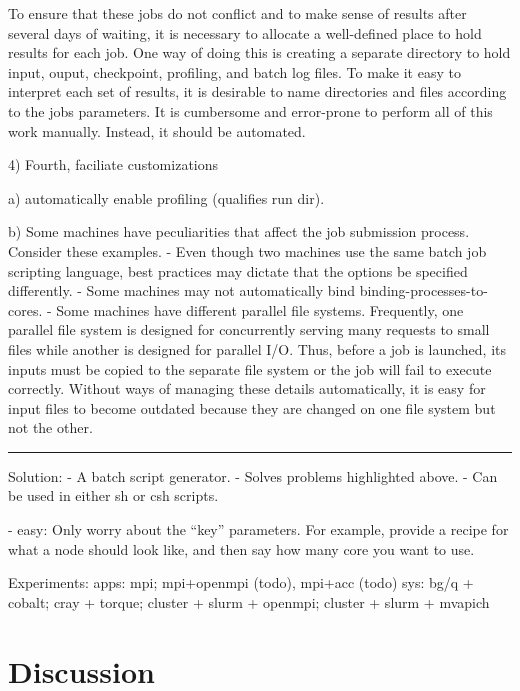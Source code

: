 To ensure that these jobs do not conflict and to make sense of results after several days of waiting, it is necessary to allocate a well-defined place to hold results for each job.
One way of doing this is creating a separate directory to hold input, ouput, checkpoint, profiling, and batch log files.
To make it easy to interpret each set of results, it is desirable to name directories and files according to the jobs parameters.
It is cumbersome and error-prone to perform all of this work manually.
Instead, it should be automated.


4) Fourth, faciliate customizations

a) automatically enable profiling (qualifies run dir).

b) Some machines have peculiarities that affect the job submission process.
Consider these examples.
- Even though two machines use the same batch job scripting language, best practices may dictate that the options be specified differently.
- Some machines may not automatically bind binding-processes-to-cores.
- Some machines have different parallel file systems.
Frequently, one parallel file system is designed for concurrently serving many requests to small files while another is designed for parallel I/O.
Thus, before a job is launched, its inputs must be copied to the separate file system or the job will fail to execute correctly.
Without ways of managing these details automatically, it is easy for input files to become outdated because they are changed on one file system but not the other.



\hrule

Solution:
- A batch script generator.
- Solves problems highlighted above.
- Can be used in either sh or csh scripts.

- easy:
  Only worry about the ``key'' parameters.
  For example, provide a recipe for what a node should look like, and then say how many core you want to use.

Experiments:
  apps: mpi; mpi+openmpi (todo), mpi+acc (todo)
  sys: bg/q + cobalt; cray + torque; cluster + slurm + openmpi; cluster + slurm + mvapich



\section{Discussion}
\label{sec:discussion}

